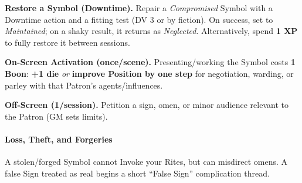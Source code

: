 \documentclass[12pt,twoside]{book}
\begin{document}
\textbf{Restore a Symbol (Downtime).} Repair a \emph{Compromised} Symbol with a Downtime action and a fitting test (DV 3 or by fiction). On success, set to \emph{Maintained}; on a shaky result, it returns as \emph{Neglected}. Alternatively, spend \textbf{1 XP} to fully restore it between sessions.

\textbf{On-Screen Activation (once/scene).} Presenting/working the Symbol costs \textbf{1 Boon}: \textbf{+1 die} \emph{or} \textbf{improve Position by one step} for negotiation, warding, or parley with that Patron’s agents/influences.

\textbf{Off-Screen (1/session).} Petition a sign, omen, or minor audience relevant to the Patron (GM sets limits).

\paragraph{Loss, Theft, and Forgeries}
A stolen/forged Symbol cannot Invoke your Rites, but can misdirect omens. A false Sign treated as real begins a short “False Sign” complication thread.
\end{document}
